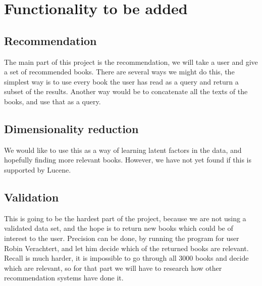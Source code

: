 \documentclass{scrartcl}
\begin{document}
\section{Functionality to be added}
\subsection{Recommendation}
The main part of this project is the recommendation, we will take a user and give a set of recommended books. There are several ways we might do this, the simplest way is to use every book the user has read as a query and return a subset of the results. Another way would be to concatenate all the texts of the books, and use that as a query.
\subsection{Dimensionality reduction}
We would like to use this as a way of learning latent factors in the data, and hopefully finding more relevant books. However, we have not yet found if this is supported by Lucene.
\subsection{Validation}
This is going to be the hardest part of the project, because we are not using a validated data set, and the hope is to return new books which could be of interest to the user. Precision can be done, by running the program for user Robin Verachtert, and let him decide which of the returned books are relevant. Recall is much harder, it is impossible to go through all 3000 books and decide which are relevant, so for that part we will have to research how other recommendation systems have done it.
\end{document}
